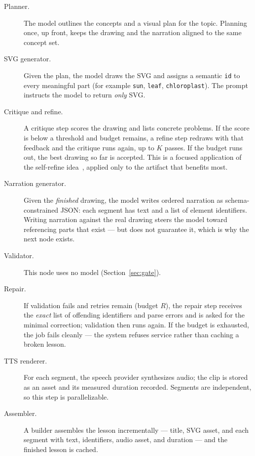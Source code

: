 \begin{description}
  \item[Planner.] The model outlines the concepts and a visual plan for the
        topic. Planning once, up front, keeps the drawing and the narration
        aligned to the same concept set.
  \item[SVG generator.] Given the plan, the model draws the SVG and assigns a
        semantic \texttt{id} to every meaningful part (for example
        \texttt{sun}, \texttt{leaf}, \texttt{chloroplast}). The prompt
        instructs the model to return \emph{only} SVG.
  \item[Critique and refine.] A critique step scores the drawing and lists
        concrete problems. If the score is below a threshold and budget
        remains, a refine step redraws with that feedback and the critique
        runs again, up to $K$ passes. If the budget runs out, the best
        drawing so far is accepted. This is a focused application of the
        self-refine idea~\cite{madaan2023selfrefine}, applied only to the
        artifact that benefits most.
  \item[Narration generator.] Given the \emph{finished} drawing, the model
        writes ordered narration as schema-constrained JSON: each segment has
        text and a list of element identifiers. Writing narration against the
        real drawing steers the model toward referencing parts that exist ---
        but does not guarantee it, which is why the next node exists.
  \item[Validator.] This node uses no model (Section~\ref{sec:gate}).
  \item[Repair.] If validation fails and retries remain (budget $R$), the
        repair step receives the \emph{exact} list of offending identifiers
        and parse errors and is asked for the minimal correction; validation
        then runs again. If the budget is exhausted, the job fails cleanly
        --- the system refuses service rather than caching a broken lesson.
  \item[TTS renderer.] For each segment, the speech provider synthesizes
        audio; the clip is stored as an asset and its measured duration
        recorded. Segments are independent, so this step is parallelizable.
  \item[Assembler.] A builder assembles the lesson incrementally --- title,
        SVG asset, and each segment with text, identifiers, audio asset, and
        duration --- and the finished lesson is cached.
\end{description}

